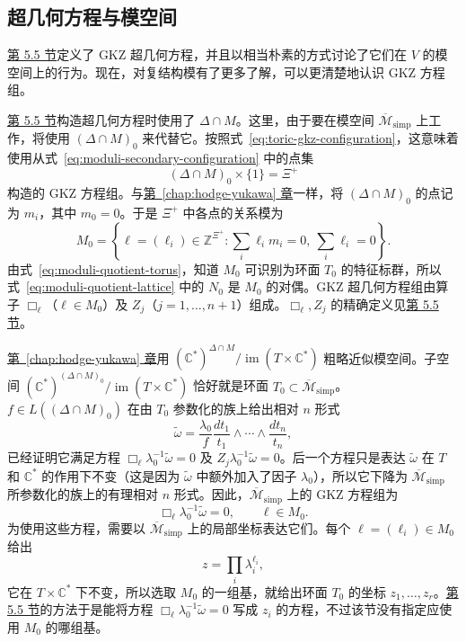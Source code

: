 \subsection{超几何方程与模空间}\label{subsec:hypergeometric-moduli}
\hyperref[sec:hypergeometric]{第 5.5 节}定义了 GKZ 超几何方程，并且以相当朴素的方式讨论了它们在 $V$ 的模空间上的行为。现在，对复结构模有了更多了解，可以更清楚地认识 GKZ 方程组。

\hyperref[sec:hypergeometric]{第 5.5 节}构造超几何方程时使用了 $\Delta\cap M$。这里，由于要在模空间 $\overline{\mathcal M}_{\mathrm{simp}}$ 上工作，将使用 $(\Delta\cap M)_0$
来代替它。按照式~\eqref{eq:toric-gkz-configuration}，这意味着使用从式~\eqref{eq:moduli-secondary-configuration} 中的点集
\[
(\Delta\cap M)_0\times\{1\}=\Xi^+
\]
构造的 GKZ 方程组。与\hyperref[chap:hodge-yukawa]{第~\ref*{chap:hodge-yukawa} 章}一样，将 $(\Delta\cap M)_0$ 的点记为 $m_i$，其中 $m_0=0$。于是 $\Xi^+$ 中各点的关系模为
\begin{equation}\label{eq:moduli-relation-lattice}
M_0=\left\{\ell=(\ell_i)\in\mathbb Z^{\Xi^+}:\sum_i\ell_i m_i=0,\ \sum_i\ell_i=0\right\}.
\end{equation}
由式~\eqref{eq:moduli-quotient-torus}，知道 $M_0$ 可识别为环面 $T_0$ 的特征标群，所以式~\eqref{eq:moduli-quotient-lattice} 中的 $N_0$ 是 $M_0$ 的对偶。GKZ 超几何方程组由算子 $\Box_\ell$（$\ell\in M_0$）及 $Z_j$（$j=1,\ldots,n+1$）组成。$\Box_\ell,Z_j$ 的精确定义见\hyperref[sec:hypergeometric]{第 5.5 节}。

\hyperref[chap:hodge-yukawa]{第~\ref*{chap:hodge-yukawa} 章}用 $(\mathbb C^*)^{\Delta\cap M}/\operatorname{im}(T\times\mathbb C^*)$ 粗略近似模空间。子空间 $(\mathbb C^*)^{(\Delta\cap M)_0}/\operatorname{im}(T\times\mathbb C^*)$ 恰好就是环面 $T_0\subset\overline{\mathcal M}_{\mathrm{simp}}$。$f\in L((\Delta\cap M)_0)$ 在由 $T_0$ 参数化的族上给出相对 $n$ 形式
\[
\widetilde\omega=\frac{\lambda_0}{f}\frac{dt_1}{t_1}\wedge\cdots\wedge\frac{dt_n}{t_n},
\]
已经证明它满足方程 $\Box_\ell\lambda_0^{-1}\widetilde\omega=0$ 及 $Z_j\lambda_0^{-1}\widetilde\omega=0$。后一个方程只是表达 $\widetilde\omega$ 在 $T$ 和 $\mathbb C^*$ 的作用下不变（这是因为 $\widetilde\omega$ 中额外加入了因子 $\lambda_0$），所以它下降为 $\overline{\mathcal M}_{\mathrm{simp}}$ 所参数化的族上的有理相对 $n$ 形式。因此，$\overline{\mathcal M}_{\mathrm{simp}}$ 上的 GKZ 方程组为
\[
\Box_\ell\lambda_0^{-1}\widetilde\omega=0,\qquad\ell\in M_0.
\]
为使用这些方程，需要以 $\overline{\mathcal M}_{\mathrm{simp}}$ 上的局部坐标表达它们。每个 $\ell=(\ell_i)\in M_0$ 给出
\begin{equation}\label{eq:moduli-monomial-coordinate}
z=\prod_i\lambda_i^{\ell_i},
\end{equation}
它在 $T\times\mathbb C^*$ 下不变，所以选取 $M_0$ 的一组基，就给出环面 $T_0$ 的坐标 $z_1,\ldots,z_r$。\hyperref[sec:hypergeometric]{第 5.5 节}的方法于是能将方程 $\Box_\ell\lambda_0^{-1}\widetilde\omega=0$ 写成 $z_i$ 的方程，不过该节没有指定应使用 $M_0$ 的哪组基。

